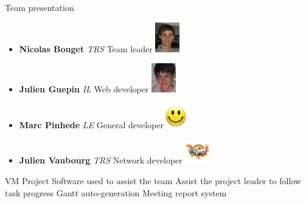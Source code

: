 \documentclass[12pt]{beamer}
\begin{document}
\begin{frame}{Team presentation}
    \begin{itemize}
	\item {\bf Nicolas Bouget} \emph{TRS} Team leader \hfill \includegraphics[width=30pt]{img/bouget.jpg}\\
	\vfill
	\item {\bf Julien Guepin} \emph{IL} Web developer \hfill \includegraphics[width=30pt]{img/guepin.jpg}
	\vfill
	\item {\bf Marc Pinhede} \emph{LE} General developer\hfill \includegraphics[width=30pt]{img/pinhede.jpg}
	\vfill
	\item {\bf Julien Vaubourg} \emph{TRS} Network developer \hfill \includegraphics[width=30pt]{img/vaubourg.jpg}
    \end{itemize}
\end{frame}


\begin{frame}{VM Project}
    Software used to assist the team
    \vfill
    Assist the project leader to follow task progress
    \vfill
    Gantt auto-generation
    \vfill
    Meeting report system
\end{frame}
\end{document}
